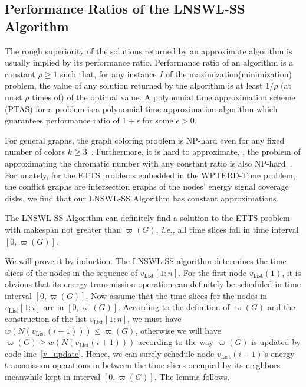 \documentclass[journal,10pt]{IEEEtran}
\begin{document}
\subsection{Performance Ratios of the LNSWL-SS Algorithm}
The rough superiority of the solutions returned by an approximate algorithm is usually implied by its performance ratio. Performance ratio of an algorithm is a constant $\rho{\geq}1$ such that, for any instance $I$ of the maximization(minimization) problem, the value of any solution returned by the algorithm is at least $1/{\rho}$ (at most $\rho$ times of) of the optimal value. A polynomial time approximation scheme (PTAS) for a problem is a polynomial time approximation algorithm which guarantees performance ratio of $1{+}\epsilon$ for some $\epsilon{>}0$.

For general graphs, the graph coloring problem is NP-hard even for any fixed number of colors $k{\geq}3$~\cite{Garey1979}. Furthermore, it is hard to approximate, , the problem of approximating the chromatic number with any constant ratio is also NP-hard~\cite{Arora1998}. Fortunately, for the ETTS problems embedded in the WPTERD-Time problem, the conflict graphs are intersection graphs of the nodes' energy signal coverage disks, we find that our LNSWL-SS Algorithm has constant approximations.

\begin{lemma}
\label{lemma_valid_solution}
The LNSWL-SS Algorithm can definitely find a solution to the ETTS problem with makespan not greater than $\varpi(G)$, \textit{i.e.,} all time slices fall in time interval $[0,\varpi(G)]$.
\end{lemma}

\begin{IEEEproof}
We will prove it by induction. The LNSWL-SS algorithm determines the time slices of the nodes in the sequence of $v_\text{List}[1{:}n]$. For the first node $v_\text{List}(1)$, it is obvious that its energy transmission operation can definitely be scheduled in time interval $[0,\varpi(G)]$. Now assume that the time slices for the nodes in $v_\text{List}[1{:}i]$ are in $[0,\varpi(G)]$. According to the definition of $\varpi(G)$ and the construction of the list $v_\text{List}[1{:}n]$, we must have $w(N(v_\text{List}(i{+}1))){\leq}\varpi(G)$, otherwise we will have $\varpi(G){\geq}w(N(v_\text{List}(i{+}1)))$ according to the way $\varpi(G)$ is updated by code line~\ref{v_update}. Hence, we can surely schedule node $v_\text{List}(i{+}1)$'s energy transmission operations in between the time slices occupied by its neighbors meanwhile kept in interval $[0,\varpi(G)]$. The lemma follows.
\end{IEEEproof}
\end{document}
